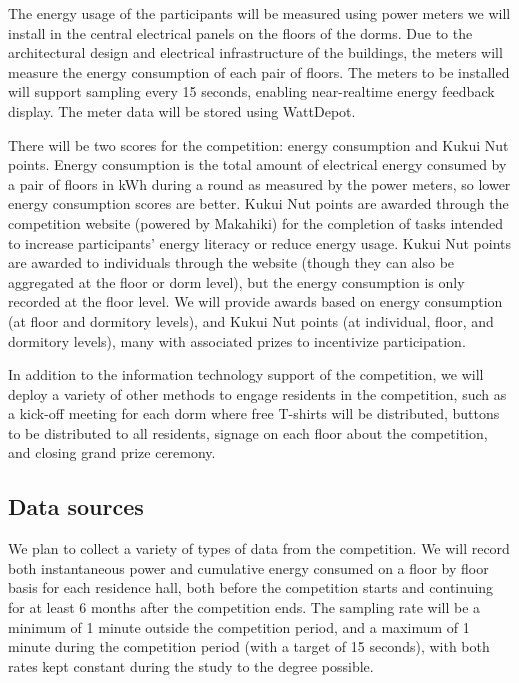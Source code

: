 The energy usage of the participants will be measured using power meters we will install in the central electrical panels on the floors of the dorms. Due to the architectural design and electrical infrastructure of the buildings, the meters will measure the energy consumption of each pair of floors. The meters to be installed will support sampling every 15 seconds, enabling near-realtime energy feedback display. The meter data will be stored using WattDepot.

There will be two scores for the competition: energy consumption and Kukui Nut points. Energy consumption is the total amount of electrical energy consumed by a pair of floors in kWh during a round as measured by the power meters, so lower energy consumption scores are better. Kukui Nut points are awarded through the competition website (powered by Makahiki) for the completion of tasks intended to increase participants' energy literacy or reduce energy usage. Kukui Nut points are awarded to individuals through the website (though they can also be aggregated at the floor or dorm level), but the energy consumption is only recorded at the floor level. We will provide awards based on energy consumption (at floor and dormitory levels), and Kukui Nut points (at individual, floor, and dormitory levels), many with associated prizes to incentivize participation.

In addition to the information technology support of the competition, we will deploy a variety of other methods to engage residents in the competition, such as a kick-off meeting for each dorm where free T-shirts will be distributed, buttons to be distributed to all residents, signage on each floor about the competition, and closing grand prize ceremony.

\subsection{Data sources}

We plan to collect a variety of types of data from the competition. We will record both instantaneous power and cumulative energy consumed on a floor by floor basis for each residence hall, both before the competition starts and continuing for at least 6 months after the competition ends. The sampling rate will be a minimum of 1 minute outside the competition period, and a maximum of 1 minute during the competition period (with a target of 15 seconds), with both rates kept constant during the study to the degree possible.

